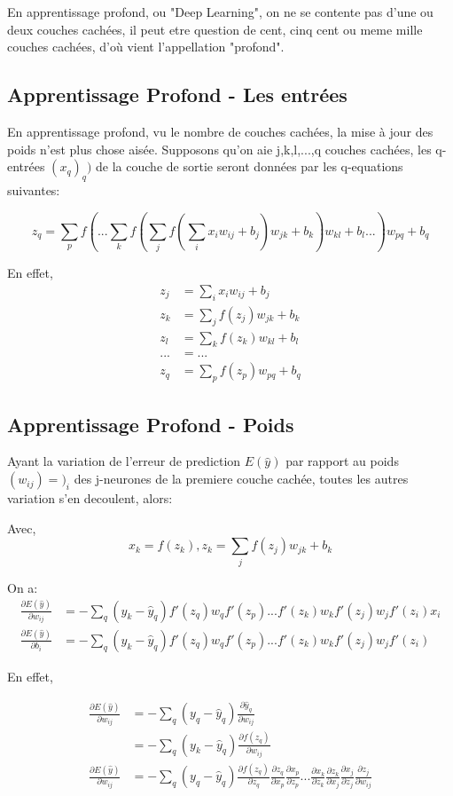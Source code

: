 \documentclass{article}
\begin{document}
En apprentissage profond, ou "Deep Learning", on ne se contente pas d'une ou deux couches cachées, il peut etre question de cent, cinq cent ou meme mille couches cachées, d'où vient l'appellation "profond".


\subsection{Apprentissage Profond - Les entrées}

En apprentissage profond, vu le nombre de couches cachées, la mise à jour des poids n'est plus chose aisée.
Supposons qu'on aie j,k,l,...,q couches cachées, les q-entrées $(x_q)_q)$ de la couche de sortie seront données par les q-equations suivantes:

$$z_q=\sum_p{f(... \sum_k{f(\sum_j{f(\sum_i{x_iw_{ij}}+b_j)w_{jk}}+b_k)w_{kl}}+b_l ...)w_{pq}}+b_q$$

En effet, 
\begin{align*}
z_j&=\sum_i{x_iw_{ij}}+b_j\\
z_k&=\sum_j{f(z_j)w_{jk}}+b_k\\
z_l&=\sum_k{f(z_k)w_{kl}}+b_l\\
...&=...\\
z_q&=\sum_p{f(z_p)w_{pq}}+b_q
\end{align*}

\subsection{Apprentissage Profond - Poids}
Ayant la variation de l'erreur de prediction $E(\hat{y})$ par rapport au poids $(w_{ij})=)_i$ des j-neurones de la premiere couche cachée, toutes les autres variation s'en decoulent, alors:

\smallbreak

Avec,
$$x_k=f(z_k), z_k=\sum_j{f(z_j)w_{jk}}+b_k$$

On a:
\begin{align*}
\frac{\partial{E(\hat{y})}}{\partial{w_{ij}}}&=-\sum_q{(y_k-\hat{y}_q)}{f'(z_q)}{w_q}{f'(z_p)}...{f'(z_k)}{w_k}{f'(z_j)}{w_j}{f'(z_i)}x_i\\
\frac{\partial{E(\hat{y})}}{\partial{b_i}}&=-\sum_q{(y_k-\hat{y}_q)}{f'(z_q)}{w_q}{f'(z_p)}...{f'(z_k)}{w_k}{f'(z_j)}{w_j}{f'(z_i)}
\end{align*}

\newpage

En effet,

\begin{align*}
\frac{\partial{E(\hat{y})}}{\partial{w_{ij}}}&=-\sum_q{(y_q-\hat{y}_q)\frac{\partial{\hat{y}_q}}{\partial{w_{ij}}}}\\
&=-\sum_q{(y_k-\hat{y}_q)\frac{\partial{f(z_q)}}{\partial{w_{ij}}}}\\
\frac{\partial{E(\hat{y})}}{\partial{w_{ij}}}&=-\sum_q{(y_q-\hat{y}_q)\frac{\partial{f(z_q)}}{\partial{z_q}}\frac{\partial{z_q}}{\partial{x_p}}\frac{\partial{x_p}}{\partial{z_p}}...\frac{\partial{x_k}}{\partial{z_k}}\frac{\partial{z_k}}{\partial{x_j}}\frac{\partial{x_j}}{\partial{z_j}}\frac{\partial{z_j}}{\partial{w_{ij}}}}
\end{align*}
\end{document}
